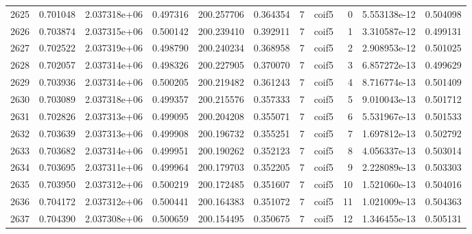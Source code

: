 \begin{tabular}{lrrrrrrlrrr}
2625 &    0.701048 &        2.037318e+06 &  0.497316 &              200.257706 &    0.364354 &       7 &        coif5 &      0 &   5.553138e-12 &      0.504098 \\
2626 &    0.703874 &        2.037315e+06 &  0.500142 &              200.239410 &    0.392911 &       7 &        coif5 &      1 &   3.310587e-12 &      0.499131 \\
2627 &    0.702522 &        2.037319e+06 &  0.498790 &              200.240234 &    0.368958 &       7 &        coif5 &      2 &   2.908953e-12 &      0.501025 \\
2628 &    0.702057 &        2.037314e+06 &  0.498326 &              200.227905 &    0.370070 &       7 &        coif5 &      3 &   6.857272e-13 &      0.499629 \\
2629 &    0.703936 &        2.037314e+06 &  0.500205 &              200.219482 &    0.361243 &       7 &        coif5 &      4 &   8.716774e-13 &      0.501409 \\
2630 &    0.703089 &        2.037318e+06 &  0.499357 &              200.215576 &    0.357333 &       7 &        coif5 &      5 &   9.010043e-13 &      0.501712 \\
2631 &    0.702826 &        2.037313e+06 &  0.499095 &              200.204208 &    0.355071 &       7 &        coif5 &      6 &   5.531967e-13 &      0.501533 \\
2632 &    0.703639 &        2.037313e+06 &  0.499908 &              200.196732 &    0.355251 &       7 &        coif5 &      7 &   1.697812e-13 &      0.502792 \\
2633 &    0.703682 &        2.037314e+06 &  0.499951 &              200.190262 &    0.352123 &       7 &        coif5 &      8 &   4.056337e-13 &      0.503014 \\
2634 &    0.703695 &        2.037311e+06 &  0.499964 &              200.179703 &    0.352205 &       7 &        coif5 &      9 &   2.228089e-13 &      0.503303 \\
2635 &    0.703950 &        2.037312e+06 &  0.500219 &              200.172485 &    0.351607 &       7 &        coif5 &     10 &   1.521060e-13 &      0.504016 \\
2636 &    0.704172 &        2.037312e+06 &  0.500441 &              200.164383 &    0.351072 &       7 &        coif5 &     11 &   1.021009e-13 &      0.504363 \\
2637 &    0.704390 &        2.037308e+06 &  0.500659 &              200.154495 &    0.350675 &       7 &        coif5 &     12 &   1.346455e-13 &      0.505131 \\

\end{tabular}

